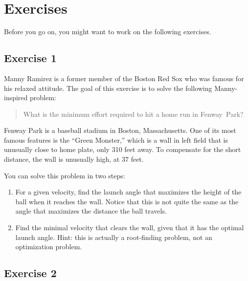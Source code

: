 \section{Exercises}

Before you go on, you might want to work on the following exercises.

\subsection{Exercise 1}


Manny Ramirez is a former member of the Boston Red Sox who was famous for his relaxed attitude.  The goal of this exercise is to solve the following Manny-inspired problem:

\begin{quote}
What is the minimum effort required to hit a home run in Fenway~Park?
\end{quote}


Fenway Park is a baseball stadium in Boston, Massachusetts.  One of its most famous features is the ``Green Monster,'' which is a wall in left field that is unusually close to home plate, only 310 feet away.  To compensate for the short distance, the wall is unusually high, at 37 feet.


You can solve this problem in two steps:

\begin{enumerate}

\item For a given velocity, find the launch angle that maximizes the height of the ball when it reaches the wall.  Notice that this is not quite the same as the angle that maximizes the distance the ball travels.


\item Find the minimal velocity that clears the wall, given that it has the optimal launch angle.  Hint: this is actually a root-finding problem, not an optimization problem.

\end{enumerate}



\subsection{Exercise 2}
\label{golf}


